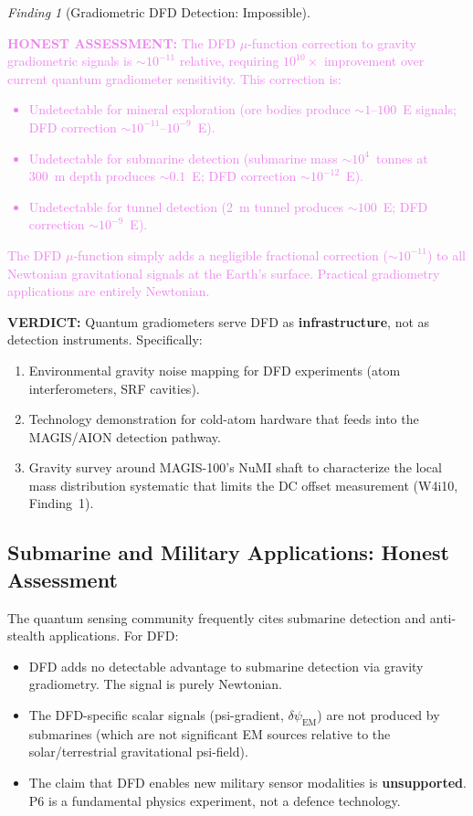 \documentclass[11pt]{article}
\theoremstyle{definition}
\theoremstyle{remark}
\newtheorem{finding}[theorem]{Finding}
\newcommand{\dpsiem}{\delta\psi_{\mathrm{EM}}}
\newcommand{\honest}[1]{\textcolor{violet}{\textbf{HONEST ASSESSMENT:} #1}}
\newcommand{\verdict}[1]{\textcolor{green!50!black}{\textbf{VERDICT:} #1}}
\begin{document}
\begin{finding}[Gradiometric DFD Detection: Impossible]
\label{find:gradiometer-apps}
\honest{The DFD $\mu$-function correction to gravity gradiometric
signals is $\sim 10^{-11}$ relative, requiring $10^{10}\times$
improvement over current quantum gradiometer sensitivity. This
correction is:

\begin{itemize}[nosep]
\item Undetectable for mineral exploration (ore bodies produce
  $\sim 1$--$100$~E signals; DFD correction $\sim 10^{-11}$--$10^{-9}$~E).
\item Undetectable for submarine detection (submarine mass
  $\sim 10^4$~tonnes at 300~m depth produces $\sim 0.1$~E;
  DFD correction $\sim 10^{-12}$~E).
\item Undetectable for tunnel detection (2~m tunnel produces
  $\sim 100$~E; DFD correction $\sim 10^{-9}$~E).
\end{itemize}

The DFD $\mu$-function simply adds a negligible fractional
correction ($\sim 10^{-11}$) to all Newtonian gravitational
signals at the Earth's surface. Practical gradiometry applications
are entirely Newtonian.}

\verdict{Quantum gradiometers serve DFD as \textbf{infrastructure},
not as detection instruments. Specifically:
\begin{enumerate}[nosep]
\item Environmental gravity noise mapping for DFD experiments
  (atom interferometers, SRF cavities).
\item Technology demonstration for cold-atom hardware that feeds
  into the MAGIS/AION detection pathway.
\item Gravity survey around MAGIS-100's NuMI shaft to characterize
  the local mass distribution systematic that limits the DC offset
  measurement (W4i10, Finding~1).
\end{enumerate}}
\end{finding}

\subsection{Submarine and Military Applications: Honest Assessment}

The quantum sensing community frequently cites submarine detection
and anti-stealth applications. For DFD:

\begin{itemize}[nosep]
\item DFD adds no detectable advantage to submarine detection via
  gravity gradiometry. The signal is purely Newtonian.
\item The DFD-specific scalar signals (psi-gradient, $\dpsiem$) are
  not produced by submarines (which are not significant EM sources
  relative to the solar/terrestrial gravitational psi-field).
\item The claim that DFD enables new military sensor modalities
  is \textbf{unsupported}. P6 is a fundamental physics experiment,
  not a defence technology.
\end{itemize}
\end{document}
